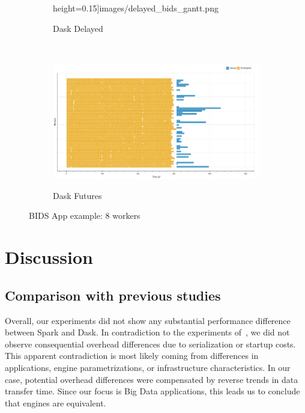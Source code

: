 \documentclass[conference]{IEEEtran}
\begin{document}
\begin{figure}[!htb]
\begin{subfigure}[b]{\columnwidth}
{        height=0.15\textheight]{images/delayed_bids_gantt.png}}
        \caption{Dask Delayed}\label{fig:bids_dask_delayed_gantt}
    \end{subfigure}
    \\
    \begin{subfigure}[b]{\columnwidth}
        \href{https://mathdugre.github.io/paper-big-data-engines/dask-futures-bids-baseline.html}{
        \includegraphics[clip,width=\columnwidth,
        height=0.15\textheight]{images/futures_bids_gantt.png}}
        \caption{Dask Futures}\label{fig:bids_dask_futures_gantt}
    \end{subfigure}
    \caption{BIDS App example: 8 workers}\label{fig:bids_gantt}
\end{figure}



\section{Discussion}


\subsection{Comparison with previous studies}

Overall, our experiments did not show any substantial performance
difference between Spark and Dask. In contradiction to the experiments
of~\cite{Mehta:17}, we did not observe consequential overhead differences
due to serialization or startup costs. This apparent contradiction is most
likely coming from differences in applications, engine parametrizations, or
infrastructure characteristics. In our case, potential overhead differences were
compensated by reverse trends in data transfer time. Since our focus is
Big Data applications, this leads us to conclude that engines are
equivalent.
\end{document}
